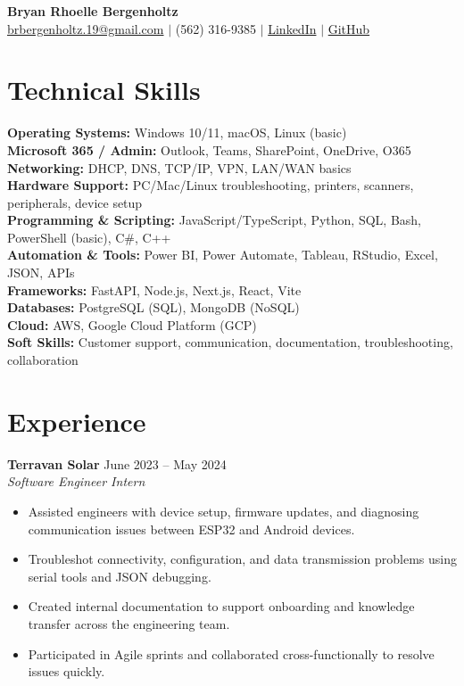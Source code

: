 \documentclass[a4paper,10pt]{article}
\newcommand{\dateright}[1]{\hfill {\small\textnormal{#1}}}
\begin{document}

\begin{center}
  {\LARGE \textbf{Bryan Rhoelle Bergenholtz}}\\[-1pt]
  \href{mailto:brbergenholtz.19@gmail.com}{brbergenholtz.19@gmail.com} $|$
  (562) 316-9385 $|$
  \href{https://linkedin.com/in/bryanbergenholtz}{LinkedIn} $|$
  \href{https://github.com/YanRho}{GitHub}
\end{center}

\section*{Technical Skills}
\textbf{Operating Systems:} Windows 10/11, macOS, Linux (basic) \\
\textbf{Microsoft 365 / Admin:} Outlook, Teams, SharePoint, OneDrive, O365 \\
\textbf{Networking:} DHCP, DNS, TCP/IP, VPN, LAN/WAN basics \\
\textbf{Hardware Support:} PC/Mac/Linux troubleshooting, printers, scanners, peripherals, device setup \\
\textbf{Programming \& Scripting:} JavaScript/TypeScript, Python, SQL, Bash, PowerShell (basic), C\#, C++ \\
\textbf{Automation \& Tools:} Power BI, Power Automate, Tableau, RStudio, Excel, JSON, APIs \\
\textbf{Frameworks:} FastAPI, Node.js, Next.js, React, Vite \\
\textbf{Databases:} PostgreSQL (SQL), MongoDB (NoSQL) \\
\textbf{Cloud:} AWS, Google Cloud Platform (GCP) \\
\textbf{Soft Skills:} Customer support, communication, documentation, troubleshooting, collaboration

\section*{Experience}

\textbf{Terravan Solar} \dateright{June 2023 – May 2024}\\
\textit{Software Engineer Intern}
\begin{itemize}
  \item Assisted engineers with device setup, firmware updates, and diagnosing communication issues between ESP32 and Android devices.
  \item Troubleshot connectivity, configuration, and data transmission problems using serial tools and JSON debugging.
  \item Created internal documentation to support onboarding and knowledge transfer across the engineering team.
  \item Participated in Agile sprints and collaborated cross-functionally to resolve issues quickly.
\end{itemize}
\end{document}
